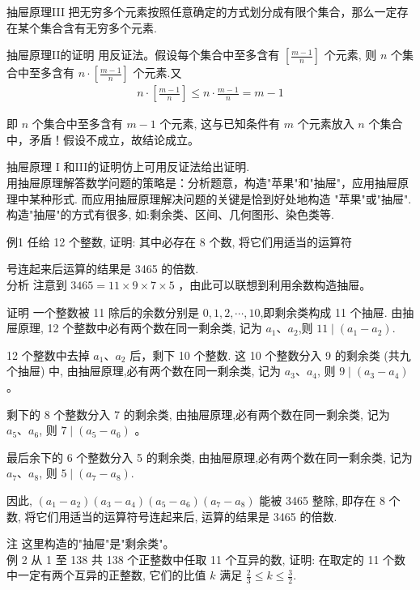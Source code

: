 \documentclass[10pt]{article}
\begin{document}
抽屉原理III 把无穷多个元素按照任意确定的方式划分成有限个集合，那么一定存在某个集合含有无穷多个元素.

抽屉原理II的证明 用反证法。假设每个集合中至多含有 $\left[\frac{m-1}{n}\right]$ 个元素, 则 $n$ 个集合中至多含有 $n \cdot\left[\frac{m-1}{n}\right]$ 个元素.又\\
\begin{align*}
n \cdot\left[\frac{m-1}{n}\right] \leqslant n \cdot \frac{m-1}{n}=m-1
\end{align*}

即 $n$ 个集合中至多含有 $m-1$ 个元素, 这与已知条件有 $m$ 个元素放入 $n$ 个集合中，矛盾！假设不成立，故结论成立。

抽屉原理 I 和III的证明仿上可用反证法给出证明.\\
用抽屉原理解答数学问题的策略是：分析题意，构造"苹果"和"抽屉"，应用抽屉原理中某种形式. 而应用抽屉原理解决问题的关键是恰到好处地构造 "苹果"或"抽屉". 构造"抽屉"的方式有很多, 如:剩余类、区间、几何图形、染色类等.

例1 任给 12 个整数, 证明: 其中必存在 8 个数, 将它们用适当的运算符

号连起来后运算的结果是 3465 的倍数.\\
分析 注意到 $3465=11 \times 9 \times 7 \times 5$ ，由此可以联想到利用余数构造抽屉。

证明 一个整数被 11 除后的余数分别是 $0,1,2, \cdots, 10$,即剩余类构成 11 个抽屉. 由抽屉原理, 12 个整数中必有两个数在同一剩余类, 记为 $a_{1} 、 a_{2}$,则 $11 \mid\left(a_{1}-a_{2}\right)$.

12 个整数中去掉 $a_{1} 、 a_{2}$ 后，剩下 10 个整数. 这 10 个整数分入 9 的剩余类 (共九个抽屉) 中, 由抽屉原理,必有两个数在同一剩余类, 记为 $a_{3} 、 a_{4}$, 则 $9 \mid\left(a_{3}-a_{4}\right)$ 。

剩下的 8 个整数分入 7 的剩余类, 由抽屉原理,必有两个数在同一剩余类, 记为 $a_{5} 、 a_{6}$, 则 $7 \mid\left(a_{5}-a_{6}\right)$ 。

最后余下的 6 个整数分入 5 的剩余类, 由抽屉原理,必有两个数在同一剩余类, 记为 $a_{7} 、 a_{8}$, 则 $5 \mid\left(a_{7}-a_{8}\right)$.

因此, $\left(a_{1}-a_{2}\right)\left(a_{3}-a_{4}\right)\left(a_{5}-a_{6}\right)\left(a_{7}-a_{8}\right)$ 能被 3465 整除, 即存在 8 个数, 将它们用适当的运算符号连起来后, 运算的结果是 3465 的倍数.

注 这里构造的"抽屉"是"剩余类"。\\
例 2 从 1 至 138 共 138 个正整数中任取 11 个互异的数, 证明: 在取定的 11 个数中一定有两个互异的正整数, 它们的比值 $k$ 满足 $\frac{2}{3} \leqslant k \leqslant \frac{3}{2}$.
\end{document}
